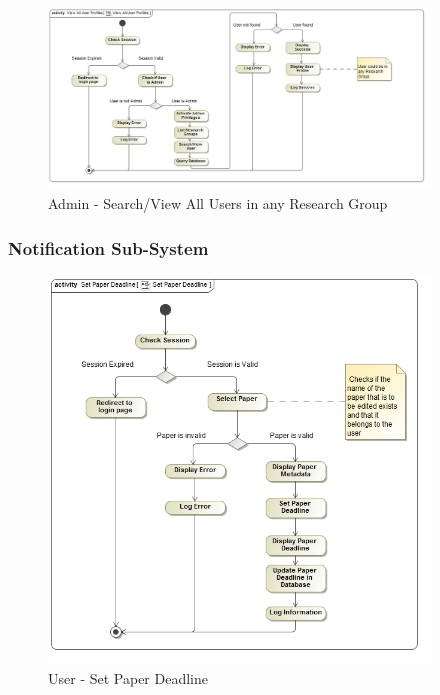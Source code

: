 \documentclass{article}
\begin{document}
			\begin{figure}[H]
				\includegraphics[width=4in, center]{../Diagrams/Process Specifications/View All User Profiles.jpg}
				\caption{Admin - Search/View All Users in any Research Group}
			\end{figure}
			
			\subsubsection{Notification Sub-System}
			\begin{figure}[H]
				\includegraphics[width=4in, center]{../Diagrams/Process Specifications/Set Paper Deadline.jpg}
				\caption{User - Set Paper Deadline}
			\end{figure}
\end{document}
